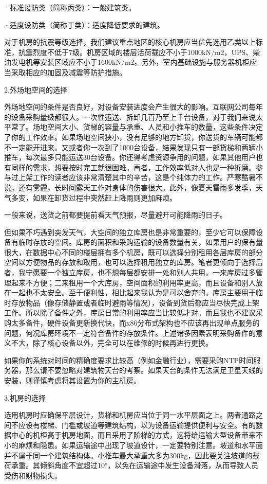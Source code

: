 \documentclass[12pt,UTF8]{ctexbook}
\begin{document}
·标准设防类（简称丙类）：一般建筑类。

·适度设防类（简称丁类）：适度降低要求的建筑。

对于机房的抗震等级选择，我们建议重点地区的核心机房应当优先选用乙类以上标准，抗震烈度不低于7级。机房区域的楼层活荷载应不小于1000kN/m2，UPS、柴油发电机等安装区域应不小于1600kN/m2。另外，室内基础设施与服务器机柜应当采取相应的加固及减震等防护措施。

2.外场地空间的选择

外场地空间的条件是否良好，对设备安装进度会产生很大的影响。互联网公司每年的设备采购量级都很大。一次性运送、拆卸几百乃至上千台设备，对于我们来说太平常了。场地空间大小、货梯的容量与承重、人员和小推车的数量，这些条件决定了你的工作效率。如果场地空间狭小，没有足够的地方卸货，你送货的车辆可能都不一定能开进来。又或者你一次到了1000台设备，结果发现只有一部货梯和两辆小推车，每次最多只能运送30台设备。你还得考虑资源争用的问题，如果其他用户也有同样的需求，想要按时完工就很困难。再者，工作效率低对人也是一种折磨。参与过上架工作的读者应该非常清楚其中的辛苦，这是个纯体力的工作。严寒酷暑不说，还有雾霾，长时间露天工作对身体的伤害很大。此外，像夏天雷雨多发季，天气多变，如果在卸货过程中突然赶上降雨则更加麻烦。

一般来说，送货之前都要提前看天气预报，尽量避开可能降雨的日子。

但如果不巧遇到突发天气，大空间的独立库房也是非常重要的，至少它可以保障设备有临时存放的空间。库房的面积和采购运输的设备数量有关，如果用户的保有量很大，在数据中心不同的楼层拥有多个机房，既可以选择分别租用各层库房的部分空间以方便物品的存放和取用，也可以选择租用独立的库房。笔者更倾向于选择后者，我宁愿要一个独立库房，也不想每层都安排一处和别人共用。一来库房过多管理起来不方便；二来租用一个大库房，空间面积的利用率更高，而且设备和别人放在一起也不太安全。至于便利性，相比起来我认为是可以舍弃的。库房主要用于临时存放物品（像存储静置或者临时避雨等情况），设备到货后都应当尽快完成上架工作。所以除了备件之外，库房日常的利用率应当比较低才对。而且我也不建议采购太多备件，硬件设备更新换代快，而x86分布式架构也不应该再出现单点服务的问题，何况库房环境不一定符合备件的存放条件。上述诸多因素表明采购备件的意义不大，除了核心设备以外，完全可以在维修的时候再进行更换。

如果你的系统对时间的精确度要求比较高（例如金融行业），需要采购NTP时间服务器，那么请不要忽略对建筑物天台的考察。如果天台的条件无法满足卫星天线的安装，则谨慎考虑将其设置为你的主机房。

3.机房的选择

选用机房时应确保平层设计，货梯和机房应当位于同一水平层面之上。两者通路之间不应设有楼梯、门槛或坡道等建筑结构，以为设备运输提供便利与安全。有的数据中心的机柜高于机房地面，而且采用了阶梯的方式，这将给运输大型设备带来不小的麻烦和隐患。如果运输途中出现了坡道设计，一定要特别注意。坡道和水平面并不属于同一个建筑结构体。小推车最大承重大多为300kg，因此要关注坡道的载荷承重。其倾斜角度不宜超过10°，以免在运输途中发生设备滑落，从而导致人员受伤和财物损失。
\end{document}
